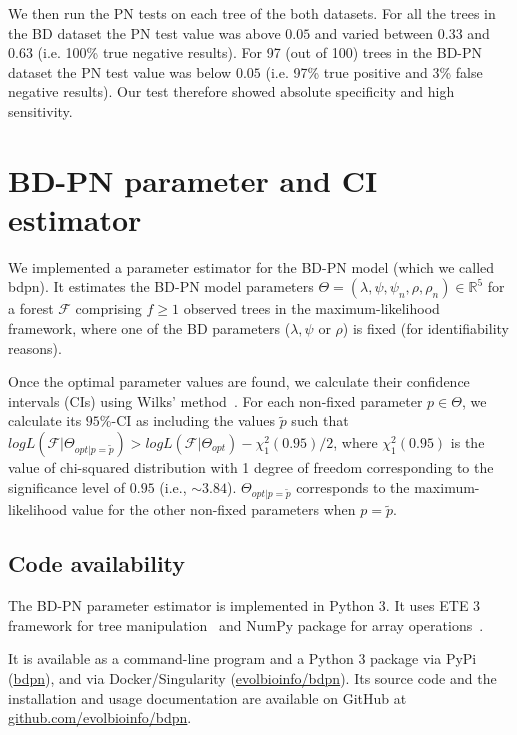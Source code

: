 \documentclass[a4paper,10pt]{article}
\begin{document}
We then run the PN tests on each tree of the both datasets. For all the trees in the BD dataset the PN test value was above $0.05$ and varied between $0.33$ and $0.63$ (i.e. 100\% true negative results). For 97 (out of 100) trees in the BD-PN dataset the PN test value was below $0.05$ (i.e. 97\% true positive and 3\% false negative results).
Our test therefore showed absolute specificity and high sensitivity.
 

\section{BD-PN parameter and CI estimator}
We implemented a parameter estimator for the BD-PN model (which we called bdpn). It estimates the BD-PN model parameters  $\Theta = (\lambda,\psi,\psi_n,\rho,\rho_n) \in \mathbb{R}^5$ for a forest $\mathscr{F}$ comprising $f \geq 1$ observed trees in the maximum-likelihood framework, where one of the BD parameters ($\lambda,\psi$ or $\rho$) is fixed (for identifiability reasons). 

Once the optimal parameter values are found, we calculate their confidence intervals (CIs) using Wilks' method~\citep{Wilks1938}.
For each non-fixed parameter $p \in \Theta$, we calculate its $95\%$-CI as including the values $\tilde{p}$ such that $log L(\mathscr{F}|\Theta_{opt|p=\tilde{p}}) > log L(\mathscr{F}| \Theta_{opt}) - \chi^2_1(0.95) / 2$, where $\chi^2_1(0.95)$ is the value of chi-squared distribution with 1 degree of freedom corresponding to the significance level of $0.95$ (i.e., $\sim3.84$). $\Theta_{opt|p=\tilde{p}}$ corresponds to the maximum-likelihood value for the other non-fixed parameters when $p = \tilde{p}$. 

\subsection*{Code availability}
The BD-PN parameter estimator is implemented in Python 3. It uses ETE 3 framework for tree manipulation~\cite{Huerta-Cepas2016} and NumPy package for array operations~\cite{harris_array_2020}. 

It is available as a command-line program and a Python 3 package via PyPi (\href{https://pypi.org/project/bdpn}{bdpn}), and via Docker/Singularity (\href{https://hub.docker.com/r/evolbioinfo/bdpn/tags}{evolbioinfo/bdpn}). Its source code and the installation and usage documentation are available on GitHub at \href{https://github.com/evolbioinfo/bdpn}{github.com/evolbioinfo/bdpn}.
\end{document}
